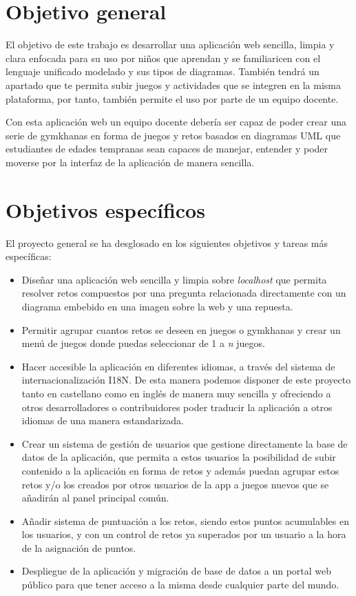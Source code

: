 \documentclass[a4paper, 12pt]{book}
\begin{document}
\section{Objetivo general} %
\label{sec:objetivo-general} %

El objetivo de este trabajo es desarrollar una aplicación web sencilla, limpia y clara enfocada para su uso por niños que aprendan y se familiaricen con el lenguaje unificado modelado y sus tipos de diagramas. También tendrá un apartado que te permita subir juegos y actividades que se integren en la misma plataforma, por tanto, también permite el uso por parte de un equipo docente.

Con esta aplicación web un equipo docente debería ser capaz de poder crear una serie de gymkhanas en forma de juegos y retos basados en diagramas UML que estudiantes de edades tempranas sean capaces de manejar, entender y poder moverse por la interfaz de la aplicación de manera sencilla. 

\section{Objetivos específicos}
\label{sec:objetivos-especificos}
El proyecto general se ha desglosado en los siguientes objetivos y tareas más específicas: 
\begin{itemize}
	\item Diseñar una aplicación web sencilla y limpia sobre \emph{localhost} que permita resolver retos compuestos por una pregunta relacionada directamente con un diagrama embebido en una imagen sobre la web y una repuesta.
	\item Permitir agrupar cuantos retos se deseen en juegos o gymkhanas y crear un menú de juegos donde puedas seleccionar de 1 a \emph{n} juegos.
	\item Hacer accesible la aplicación en diferentes idiomas, a través del sistema de internacionalización I18N. De esta manera podemos disponer de este proyecto tanto en castellano como en inglés de manera muy sencilla y ofreciendo a otros desarrolladores o contribuidores poder traducir la aplicación a otros idiomas de una manera estandarizada. 
	\item Crear un sistema de gestión de usuarios que gestione directamente la base de datos de la aplicación, que permita a estos usuarios la posibilidad de subir contenido a la aplicación en forma de retos y además puedan agrupar estos retos y/o los creados por otros usuarios de la app a juegos nuevos que se añadirán al panel principal común.
	\item Añadir sistema de puntuación a los retos, siendo estos puntos acumulables en los usuarios, y con un control de retos ya superados por un usuario a la hora de la asignación de puntos. 
	\item Despliegue de la aplicación y migración de base de datos a un portal web público para que tener acceso a la misma desde cualquier parte del mundo.
\end{itemize}
\end{document}
